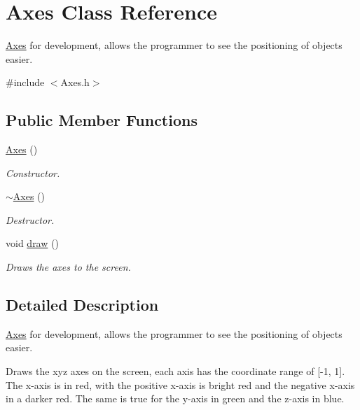 \hypertarget{class_axes}{}\section{Axes Class Reference}
\label{class_axes}


\hyperlink{class_axes}{Axes} for development, allows the programmer to see the positioning of objects easier.  




{\ttfamily \#include $<$Axes.\+h$>$}

\subsection*{Public Member Functions}
\begin{DoxyCompactItemize}
\item 
\hyperlink{class_axes_a267a0b09346b4f3fb7ef92383f1f1d30}{Axes} ()
\begin{DoxyCompactList}\small\item\em Constructor. \end{DoxyCompactList}\item 
\hyperlink{class_axes_a2501d30bd3ac0031a22dbaa3fb377ed3}{$\sim$\+Axes} ()
\begin{DoxyCompactList}\small\item\em Destructor. \end{DoxyCompactList}\item 
\mbox{\label{class_axes_a0ce5b9e9d511ca9567e6357b946533c4}} 
void \hyperlink{class_axes_a0ce5b9e9d511ca9567e6357b946533c4}{draw} ()
\begin{DoxyCompactList}\small\item\em Draws the axes to the screen. \end{DoxyCompactList}\end{DoxyCompactItemize}


\subsection{Detailed Description}
\hyperlink{class_axes}{Axes} for development, allows the programmer to see the positioning of objects easier. 

Draws the xyz axes on the screen, each axis has the coordinate range of \mbox{[}-\/1, 1\mbox{]}. The x-\/axis is in red, with the positive x-\/axis is bright red and the negative x-\/axis in a darker red. The same is true for the y-\/axis in green and the z-\/axis in blue. 

